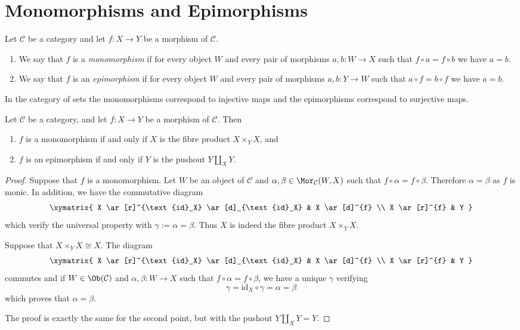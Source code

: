 \section{Monomorphisms and Epimorphisms}
\label{section-mono-epi}

\begin{definition}
\label{definition-mono-epi}
Let $\mathcal{C}$ be a category and let $f : X \to Y$ be
a morphism of $\mathcal{C}$.
\begin{enumerate}
\item We say that $f$ is a {\it monomorphism} if for every object
$W$ and every pair of morphisms $a, b : W \to X$ such that
$f \circ a = f \circ b$ we have $a = b$.
\item We say that $f$ is an {\it epimorphism} if for every object
$W$ and every pair of morphisms $a, b : Y \to W$ such that
$a \circ f = b \circ f$ we have $a = b$.
\end{enumerate}
\end{definition}

\begin{example}
\label{example-mono-epi-sets}
In the category of sets the monomorphisms correspond to injective
maps and the epimorphisms correspond to surjective maps.
\end{example}

\begin{lemma}
\label{lemma-characterize-mono-epi}
Let $\mathcal{C}$ be a category, and let $f : X \to Y$ be
a morphism of $\mathcal{C}$. Then
\begin{enumerate}
\item $f$ is a monomorphism if and only if $X$ is the fibre
product $X \times_Y X$, and
\item $f$ is an epimorphism if and only if $Y$ is the pushout
$Y \amalg_X Y$.
\end{enumerate}
\end{lemma}

\begin{proof}
Suppose that $f$ is a monomorphism. Let $W$ be an object of $\mathcal C$
and $\alpha, \beta \in \Mor_\mathcal C(W,X)$ such that $f\circ \alpha = f\circ
\beta$. Therefore $\alpha = \beta$ as $f$ is monic. In addition, we have the
commutative diagram
$$
\xymatrix{
X \ar[r]^{\text{id}_X} \ar[d]_{\text{id}_X} & X \ar[d]^{f} \\
X \ar[r]^{f} & Y
}
$$
which verify the universal property with $\gamma := \alpha = \beta$.
Thus $X$ is indeed the fibre product $X\times_Y X$.

\medskip\noindent
Suppose that $X \times_Y X \cong X $. The diagram
$$
\xymatrix{
X \ar[r]^{\text{id}_X} \ar[d]_{\text{id}_X} & X \ar[d]^{f} \\
X \ar[r]^{f} & Y }
$$
commutes and if $W \in \Ob(\mathcal C)$ and $\alpha, \beta : W \to X$
such that $f \circ \alpha = f \circ \beta$, we have a unique
$\gamma$ verifying
$$
\gamma = \text{id}_X\circ\gamma = \alpha = \beta
$$
which proves that $\alpha = \beta$.

\medskip\noindent
The proof is exactly the same for the second point, but with the
pushout $Y\amalg_X Y = Y$.
\end{proof}





